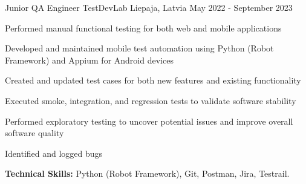

\begin{cventries}

  \cventry
    {Junior QA Engineer} %
    {TestDevLab} %
    {Liepaja, Latvia} %
    {May 2022 - September 2023} %
    {
      \begin{cvitems} %
        \item {Performed manual functional testing for both web and mobile applications}
        \item {Developed and maintained mobile test automation using Python (Robot Framework) and Appium for Android devices}
        \item {Created and updated test cases for both new features and existing functionality}
        \item {Executed smoke, integration, and regression tests to validate software stability}
        \item {Performed exploratory testing to uncover potential issues and improve overall software quality}
        \item {Identified and logged bugs}
        \item{\textbf{Technical Skills:} Python (Robot Framework), Git, Postman, Jira, Testrail.}
      \end{cvitems}
    }

\end{cventries}
